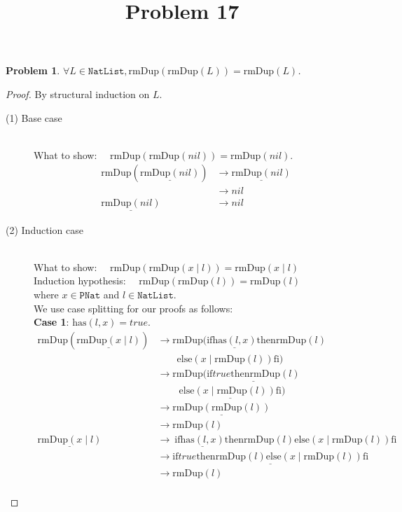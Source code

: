 \documentclass[12pt, a4paper]{article}
\title{Problem 17}
\date{\vspace{-5ex}}
\newtheorem{problem}{Problem}
\newcommand{\rel}[1]{\mathrel{#1}}
\newcommand{\rmx}[1]{\mathrm{#1}}
\newcommand{\larrow}{\longrightarrow}
\newcommand{\under}{\underline}
\begin{document}
\maketitle

\begin{problem}
$\forall L \in \mathtt{NatList}, \rmx{rmDup}(\rmx{rmDup}(L)) = \rmx{rmDup}(L)$.
\end{problem}
\begin{proof}
By structural induction on $L$.
\begin{description}
\item[(1) Base case]~\\
\noindent
What to show: $\quad \rmx{rmDup}(\rmx{rmDup}(nil)) = \rmx{rmDup}(nil)$.
\begin{align*}
\rmx{rmDup}(\under{\rmx{rmDup}(nil)})
	&\larrow \under{\rmx{rmDup}(nil)} \tag{by rmDup1} \\
	&\larrow nil \tag{by rmDup1} \\
\under{\rmx{rmDup}(nil)}
	&\larrow nil \tag{by rmDup1}
\end{align*}

\item[(2) Induction case]~\\
What to show: $\quad \rmx{rmDup}(\rmx{rmDup}(x \mid l)) = \rmx{rmDup}(x \mid l)$\\
Induction hypothesis: $\quad \rmx{rmDup}(\rmx{rmDup}(l)) = \rmx{rmDup}(l)$  \\
where $x \in \mathtt{PNat}$ and $l \in \mathtt{NatList}$.\\
We use case splitting for our proofs as follows: \\
\textbf{Case 1}: $\rmx{has}(l, x) = true$.
\begin{align*}
\rmx{rmDup}(\under{\rmx{rmDup}(x \mid l)})
	&\larrow \rmx{rmDup}(\rel{\rmx{if}} \under{\rmx{has}(l, x)} \rel{\rmx{then}} \rmx{rmDup}(l) \\
	&\quad \quad \rel{\rmx{else}} (x \mid \rmx{rmDup}(l)) \rel{\rmx{fi}}) \tag{by rmDup2} \\
	&\larrow \rmx{rmDup}(\under{\rel{\rmx{if}} true \rel{\rmx{then}} \rmx{rmDup}(l)} \\
	&\quad \quad\ \under{\rel{\rmx{else}} (x \mid \rmx{rmDup}(l)) \rel{\rmx{fi}}}) \tag{by case splitting} \\
	&\larrow \under{\rmx{rmDup}(\rmx{rmDup}(l))} \tag{by if1} \\
	&\larrow \rmx{rmDup}(l) \tag{by IH} \\
\under{\rmx{rmDup}(x \mid l)}
	&\larrow\ \rel{\rmx{if}} \under{\rmx{has}(l, x)} \rel{\rmx{then}} \rmx{rmDup}(l) \rel{\rmx{else}} (x \mid \rmx{rmDup}(l)) \rel{\rmx{fi}} \tag{by rmDup2} \\
	&\larrow \under{\rel{\rmx{if}} true \rel{\rmx{then}} \rmx{rmDup}(l) \rel{\rmx{else}} (x \mid \rmx{rmDup}(l)) \rel{\rmx{fi}}} \tag{by case splitting} \\
	&\larrow \rmx{rmDup}(l) \tag{by if1} \\
\end{align*}


\end{description}
\end{proof}
\end{document}
